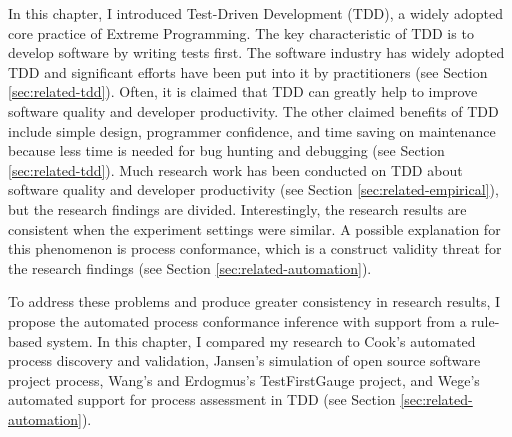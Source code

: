 In this chapter, I introduced Test-Driven Development (TDD), a widely 
adopted core practice of Extreme Programming. The key characteristic
of TDD is to develop software by writing tests first. The software industry has 
widely adopted TDD and significant efforts have been put into it by 
practitioners (see Section \ref{sec:related-tdd}). Often, it is claimed 
that TDD can greatly help to improve software quality and developer 
productivity. The other claimed benefits of TDD include simple design, 
programmer confidence, and time 
saving on maintenance because less time is needed for bug hunting and 
debugging (see Section \ref{sec:related-tdd}). Much research work has been 
conducted on TDD about software quality and developer productivity 
(see Section \ref{sec:related-empirical}), but the research findings are 
divided. Interestingly, the research results are consistent
when the experiment settings were similar. A possible explanation 
for this phenomenon is process conformance, which is a construct validity
threat for the research findings (see Section \ref{sec:related-automation}). 

To address these problems and produce greater consistency in research 
results, I propose the automated process conformance inference with 
support from a rule-based system. In this chapter, I compared my research 
to Cook's automated process discovery and validation, Jansen's simulation 
of open source software project process, Wang's and Erdogmus's TestFirstGauge 
project, and Wege's automated support for process assessment in TDD 
(see Section \ref{sec:related-automation}).

